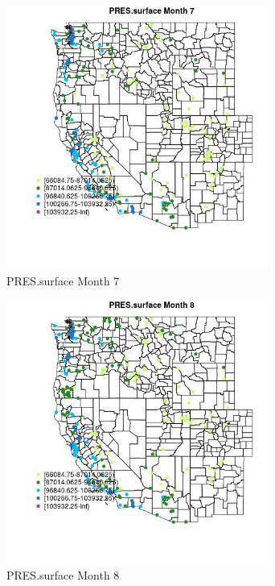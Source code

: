 \begin{figure} 
\centering  
\includegraphics[width=0.77\textwidth]{Code_Outputs/Report_ML_input_PM25_Step4_part_e_de_duplicated_aveswNAs_MapObsMo7PRESsurface.jpg} 
\caption{\label{fig:Report_ML_input_PM25_Step4_part_e_de_duplicated_aveswNAsMapObsMo7PRESsurface}PRES.surface Month 7} 
\end{figure} 
 

\begin{figure} 
\centering  
\includegraphics[width=0.77\textwidth]{Code_Outputs/Report_ML_input_PM25_Step4_part_e_de_duplicated_aveswNAs_MapObsMo8PRESsurface.jpg} 
\caption{\label{fig:Report_ML_input_PM25_Step4_part_e_de_duplicated_aveswNAsMapObsMo8PRESsurface}PRES.surface Month 8} 
\end{figure} 
 

